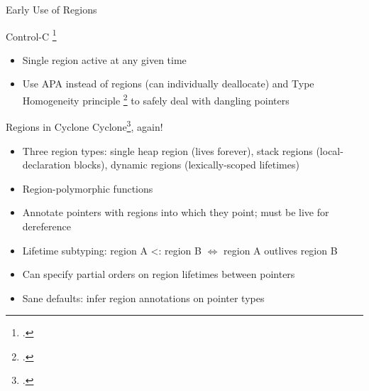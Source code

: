 \documentclass[aspectratio=169]{beamer}
\begin{document}
\begin{frame}{Early Use of Regions}
{Control-C \footcite{fullcite:kowshik_ensuring_2002}
    \vspace{-0.1in}
    \begin{itemize}
        \item Single region active at any given time
        \item Use APA instead of regions (can individually deallocate) and Type Homogeneity principle \footcite{fullcite:dhurjati_memory_2003} to safely deal with dangling pointers
    \end{itemize}
}
    \vspace{0.2in}
\end{frame}

\begin{frame}{Regions in Cyclone}
    Cyclone\footcite{grossman_region-based_2002}, again!
    \begin{itemize}[<+->]
        \item Three region types: single \alert{heap} region (lives forever), \alert{stack} regions (local-declaration blocks), \alert{dynamic} regions (lexically-scoped lifetimes)
        \item Region-polymorphic functions
        \item Annotate pointers with regions into which they point; must be live for dereference
        \item Lifetime subtyping: region A <: region B $\Leftrightarrow$ region A \alert{outlives} region B
        \item Can specify partial orders on region lifetimes between pointers
        \item Sane defaults: infer region annotations on pointer types  %
    \end{itemize}
    \vspace{0.1in}
\end{frame}
\end{document}
